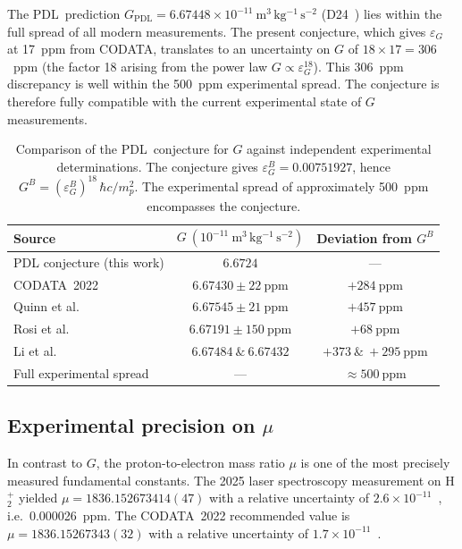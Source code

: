 \documentclass[11pt,a4paper]{article}
\theoremstyle{definition}
\newcommand{\PDL}{\textnormal{PDL}}
\newcommand{\epsg}{\varepsilon_G}
\newcommand{\GPDL}{G_{\mathrm{PDL}}}
\begin{document}
The \PDL\ prediction $\GPDL = 6.67448\times10^{-11}\ \mathrm{m^3\,kg^{-1}\,s^{-2}}$ (D24~\cite{Bridge_PDL_2026}) lies within the full spread of all modern measurements. The present conjecture, which gives $\epsg$ at 17~ppm from CODATA, translates to an uncertainty on $G$ of $18 \times 17 = 306$~ppm (the factor 18 arising from the power law $G \propto \epsg^{18}$). This 306~ppm discrepancy is well within the 500~ppm experimental spread. The conjecture is therefore fully compatible with the current experimental state of $G$ measurements.

\begin{table}[ht]
\centering
\caption{Comparison of the \PDL\ conjecture for $G$ against independent experimental determinations. The conjecture gives $\epsg^B = 0.00751927$, hence $G^B = (\epsg^B)^{18}\,\hbar c/m_p^2$. The experimental spread of approximately 500~ppm encompasses the conjecture.}
\label{tab:G_comparison}
\bigskip
\begin{tabular}{p{5cm}cc}
\toprule
Source & $G\ (10^{-11}\ \mathrm{m^3\,kg^{-1}\,s^{-2}})$ & Deviation from $G^B$ \\
\midrule
PDL conjecture (this work) & $6.6724$ & --- \\
CODATA~2022~\cite{CODATA_2022} & $6.67430 \pm 22\ \mathrm{ppm}$ & $+284\ \mathrm{ppm}$ \\
Quinn et al.~\cite{Quinn_2013} & $6.67545 \pm 21\ \mathrm{ppm}$ & $+457\ \mathrm{ppm}$ \\
Rosi et al.~\cite{Rosi_2014} & $6.67191 \pm 150\ \mathrm{ppm}$ & $+68\ \mathrm{ppm}$ \\
Li et al.~\cite{Li_2018} & $6.67484\ \&\ 6.67432$ & $+373\ \&\ +295\ \mathrm{ppm}$ \\
\midrule
Full experimental spread & --- & $\approx 500\ \mathrm{ppm}$ \\
\bottomrule
\end{tabular}
\end{table}

\subsection{Experimental precision on \texorpdfstring{$\mu$}{mu}}
\label{subsec:mu_precision}

In contrast to $G$, the proton-to-electron mass ratio $\mu$ is one of the most precisely measured fundamental constants. The 2025 laser spectroscopy measurement on H$_2^+$ yielded $\mu = 1836.152673414(47)$ with a relative uncertainty of $2.6\times10^{-11}$~\cite{Alighanbari_2025,Sci_HD_2020}, i.e.\ 0.000026~ppm. The CODATA~2022 recommended value is $\mu = 1836.15267343(32)$ with a relative uncertainty of $1.7\times10^{-11}$~\cite{CODATA_2022}.
\end{document}
